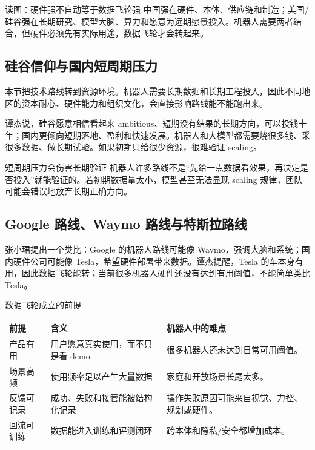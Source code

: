 \documentclass[a4paper]{article}
\begin{document}
\begin{knowledgebox}{读图：硬件强不自动等于数据飞轮强}
中国强在硬件、本体、供应链和制造；美国/硅谷强在长期研究、模型大脑、算力和愿意为远期愿景投入。机器人需要两者结合，但硬件必须先有实际用途，数据飞轮才会转起来。
\end{knowledgebox}

\subsection{硅谷信仰与国内短周期压力}

本节把技术路线转到资源环境。机器人需要长期数据和长期工程投入，因此不同地区的资本耐心、硬件能力和组织文化，会直接影响路线能不能跑出来。

谭杰说，硅谷愿意相信看起来 ambitious、短期没有结果的长期方向，可以投钱十年；国内更倾向短期落地、盈利和快速发展。机器人和大模型都需要烧很多钱、采很多数据、做长期试验。如果初期只给很少资源，很难验证 scaling。

\begin{warningbox}{短周期压力会伤害长期验证}
机器人许多路线不是“先给一点数据看效果，再决定是否投入”就能验证的。若初期数据量太小，模型甚至无法显现 scaling 规律，团队可能会错误地放弃长期正确方向。
\end{warningbox}

\subsection{Google 路线、Waymo 路线与特斯拉路线}

张小珺提出一个类比：Google 的机器人路线可能像 Waymo，强调大脑和系统；国内硬件公司可能像 Tesla，希望硬件部署带来数据。谭杰提醒，Tesla 的车本身有用，因此数据飞轮能转；当前很多机器人硬件还没有达到有用阈值，不能简单类比 Tesla。

\begin{knowledgebox}{数据飞轮成立的前提}
\begin{tabularx}{\textwidth}{p{}p{}X}
\toprule
前提 & 含义 & 机器人中的难点 \\
\midrule
产品有用 & 用户愿意真实使用，而不只是看 demo & 很多机器人还未达到日常可用阈值。 \\
场景高频 & 使用频率足以产生大量数据 & 家庭和开放场景长尾太多。 \\
反馈可记录 & 成功、失败和接管能被结构化记录 & 操作失败原因可能来自视觉、力控、规划或硬件。 \\
回流可训练 & 数据能进入训练和评测闭环 & 跨本体和隐私/安全都增加成本。 \\
\bottomrule
\end{tabularx}
\end{knowledgebox}
\end{document}
